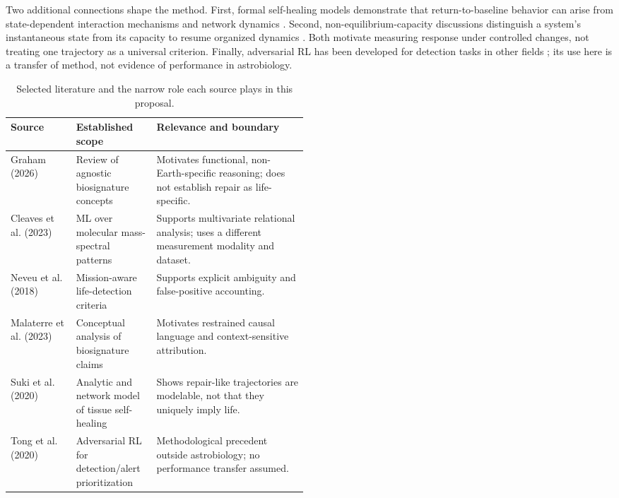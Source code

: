 \documentclass[11pt]{article}
\begin{document}
Two additional connections shape the method. First, formal self-healing models demonstrate that return-to-baseline behavior can arise from state-dependent interaction mechanisms and network dynamics \citep{Suki2020SelfHealing}. Second, non-equilibrium-capacity discussions distinguish a system's instantaneous state from its capacity to resume organized dynamics \citep{Youk2026NonEquilibrium}. Both motivate measuring response under controlled changes, not treating one trajectory as a universal criterion. Finally, adversarial RL has been developed for detection tasks in other fields \citep{Tong2020AdversarialRL}; its use here is a transfer of method, not evidence of performance in astrobiology.

\begin{table}[htbp]
\centering\small
\caption{Selected literature and the narrow role each source plays in this proposal.}
\label{tab:literature}
\begin{tabularx}{\linewidth}{p{0.22\linewidth}p{0.27\linewidth}X}
\toprule
Source & Established scope & Relevance and boundary \\
\midrule
Graham (2026) \citep{Graham2026Agnostic} & Review of agnostic biosignature concepts & Motivates functional, non-Earth-specific reasoning; does not establish repair as life-specific. \\
Cleaves et al. (2023) \citep{Cleaves2023MLBiosignature} & ML over molecular mass-spectral patterns & Supports multivariate relational analysis; uses a different measurement modality and dataset. \\
Neveu et al. (2018) \citep{Neveu2018Ladder} & Mission-aware life-detection criteria & Supports explicit ambiguity and false-positive accounting. \\
Malaterre et al. (2023) \citep{Malaterre2023Biosignature} & Conceptual analysis of biosignature claims & Motivates restrained causal language and context-sensitive attribution. \\
Suki et al. (2020) \citep{Suki2020SelfHealing} & Analytic and network model of tissue self-healing & Shows repair-like trajectories are modelable, not that they uniquely imply life. \\
Tong et al. (2020) \citep{Tong2020AdversarialRL} & Adversarial RL for detection/alert prioritization & Methodological precedent outside astrobiology; no performance transfer assumed. \\
\bottomrule
\end{tabularx}
\end{table}
\end{document}
